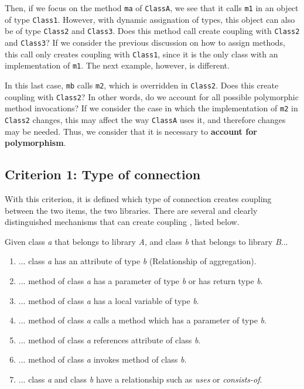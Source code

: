 \documentclass[a4paper]{article}
\begin{document}
Then, if we focus on the method \texttt{ma} of \texttt{ClassA}, we see that it calls \texttt{m1} in an object of type \texttt{Class1}. However, with dynamic assignation of types, this object can also be of type \texttt{Class2} and \texttt{Class3}. Does this method call create coupling with \texttt{Class2} and \texttt{Class3}? If we consider the previous discussion on how to assign methods, this call only creates coupling with \texttt{Class1}, since it is the only class with an implementation of \texttt{m1}. The next example, however, is different.

In this last case, \texttt{mb} calls \texttt{m2}, which is overridden in \texttt{Class2}. Does this create coupling with \texttt{Class2}? In other words, do we account for all possible polymorphic method invocations? If we consider the case in which the implementation of \texttt{m2} in \texttt{Class2} changes, this may affect the way \texttt{ClassA} uses it, and therefore changes may be needed. Thus, we consider that it is necessary to \textbf{account for polymorphism}.

\subsection{Criterion 1: Type of connection}
With this criterion, it is defined which type of connection creates coupling between the two items, the two libraries. There are several and clearly distinguished mechanisms that can create coupling \cite{briand1999unified}, listed below.

Given class \textit{a} that belongs to library \textit{A}, and class \textit{b} that belongs to library \textit{B}...

\begin{enumerate}[noitemsep,leftmargin=*]
  \item ... class \textit{a} has an attribute of type \textit{b} (Relationship of aggregation).
  \item ... method of class \textit{a} has a parameter of type \textit{b} or has return type \textit{b}.
  \item ... method of class \textit{a} has a local variable of type \textit{b}.
  \item ... method of class \textit{a} calls a method which has a parameter of type \textit{b}.
  \item ... method of class \textit{a} references attribute of class \textit{b}.
  \item ... method of class \textit{a} invokes method of class \textit{b}.
  \item ... class \textit{a} and class \textit{b} have a relationship such as \textit{uses} or \textit{consists-of}.
\end{enumerate}
\end{document}
